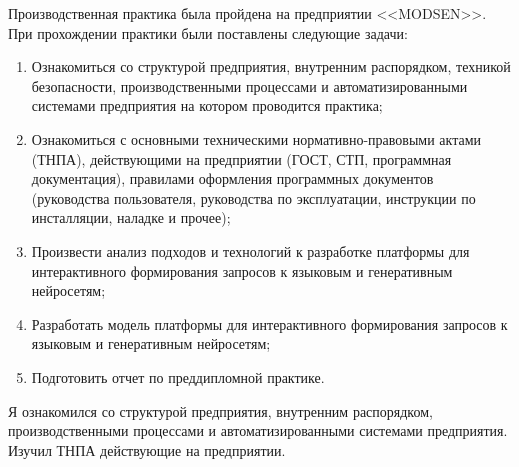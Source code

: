 \label{sec:practice:introduction}
Производственная практика была пройдена на предприятии <<MODSEN>>. При прохождении практики были поставлены следующие задачи:
\begin{enumerate}[label=\arabic*]
    \item {Ознакомиться со структурой предприятия, внутренним распорядком, техникой безопасности, производственными процессами и автоматизированными системами предприятия на котором проводится практика;}
    \item{Ознакомиться с основными техническими нормативно-правовыми актами (ТНПА), действующими на предприятии (ГОСТ, СТП, программная документация), правилами  оформления программных документов (руководства пользователя, руководства по эксплуатации, инструкции по инсталляции, наладке и прочее);}
    \item{Произвести анализ подходов и технологий к разработке платформы для интерактивного формирования запросов к языковым и генеративным нейросетям;} 
    \item{Разработать модель платформы для интерактивного формирования запросов к языковым и генеративным нейросетям;} %
    \item{Подготовить отчет по преддипломной практике.}
\end{enumerate}
Я ознакомился со структурой предприятия, внутренним распорядком, производственными процессами и автоматизированными системами предприятия. Изучил ТНПА действующие на предприятии.